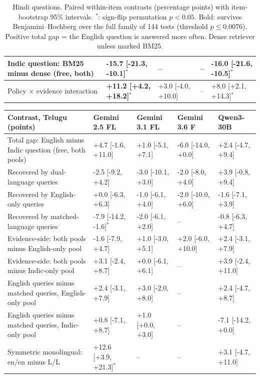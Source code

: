 \begin{table}[t]
\begin{tabular}{@{}p{5.2cm}llll@{}}
Indic question: BM25 minus dense (free, both) & \textbf{-15.7 [-21.3, -10.1]$^{*}$} & -- & -- & \textbf{-16.0 [-21.6, -10.5]$^{*}$} \\
\midrule
Policy $\times$ evidence interaction & \textbf{+11.2 [+4.2, +18.2]$^{*}$} & +3.0 [-4.0, +10.0] & -- & +8.0 [+2.1, +14.3]$^{*}$ \\
\bottomrule
\end{tabular}
\caption{Hindi questions. Paired within-item contrasts (percentage points) with item-bootstrap 95\% intervals. $^{*}$: sign-flip permutation $p<0.05$. Bold: survives Benjamini--Hochberg over the full family of 144 tests (threshold $p \le 0.0076$). Positive total gap = the English question is answered more often. Dense retriever unless marked BM25.}
\label{tab:fullcontrasts}
\end{table}
\begin{table}[t]\centering\footnotesize
\setlength{\tabcolsep}{3pt}
\begin{tabular}{@{}p{5.2cm}llll@{}}
\toprule
Contrast, Telugu (points) & Gemini 2.5 FL & Gemini 3.1 FL & Gemini 3.6 F & Qwen3-30B \\
\midrule
Total gap: English minus Indic question (free, both pools) & +4.7 [-1.6, +11.0] & +1.0 [-5.1, +7.1] & -6.0 [-14.0, +0.0] & +2.4 [-4.7, +9.4] \\
Recovered by dual-language queries & -2.5 [-9.2, +4.2] & -3.0 [-10.1, +3.0] & -2.0 [-8.0, +4.0] & +3.9 [-0.8, +9.4] \\
Recovered by English-only queries & +0.0 [-6.3, +6.3] & -1.0 [-6.1, +4.0] & -2.0 [-10.0, +6.0] & -1.6 [-7.1, +3.9] \\
Recovered by matched-language queries & -7.9 [-14.2, -1.6]$^{*}$ & -2.0 [-6.1, +2.0] & -- & -0.8 [-6.3, +4.7] \\
Evidence-side: both pools minus English-only pool & -1.6 [-7.9, +4.7] & +1.0 [-3.0, +5.1] & +2.0 [-6.0, +10.0] & +2.4 [-3.1, +7.9] \\
Evidence-side: both pools minus Indic-only pool & +3.1 [-2.4, +8.7] & +0.0 [-6.1, +6.1] & -- & +3.9 [-2.4, +11.0] \\
English queries minus matched queries, English-only pool & +2.4 [-3.1, +7.9] & +3.0 [-2.0, +8.0] & -- & +2.4 [-4.7, +8.7] \\
English queries minus matched queries, Indic-only pool & +0.8 [-7.1, +8.7] & +1.0 [+0.0, +3.0] & -- & -7.1 [-14.2, +0.0] \\
Symmetric monolingual: en/en minus L/L & +12.6 [+3.9, +21.3]$^{*}$ & -- & -- & +3.1 [-4.7, +11.0] \\

\end{tabular}
\end{table}

